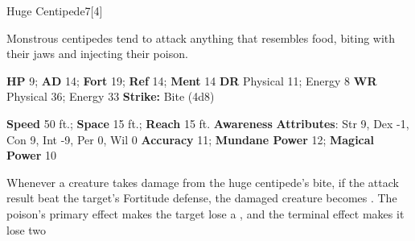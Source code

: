   \begin{monsection}{Huge Centipede}{7}[4]
    \vspace{-1em}\vspace{-1em}
    \vspace{0em}

    
    Monstrous centipedes tend to attack anything that resembles food, biting with their jaws and injecting their poison.
  

    \begin{spellcontent}
      \begin{spelltargetinginfo}
        \pari \textbf{HP} 9;
          \textbf{AD} 14;
          \textbf{Fort} 19;
          \textbf{Ref} 14;
          \textbf{Ment} 14
        \pari \textbf{DR} Physical 11; Energy 8
        \pari \textbf{WR} Physical 36; Energy 33
        \pari \textbf{Strike:}
            Bite  (4d8)
      \end{spelltargetinginfo}
    \end{spellcontent}
    \begin{monsterfooter}
      \pari \textbf{Speed} 50 ft.;
        \textbf{Space} 15 ft.;
        \textbf{Reach} 15 ft.
      \pari \textbf{Awareness} 
      \pari \textbf{Attributes}:
        Str 9, Dex -1,
        Con 9, Int -9,
        Per 0, Wil 0
      \pari \textbf{Accuracy} 11;
        \textbf{Mundane Power} 12;
      \textbf{Magical Power} 10
    \end{monsterfooter}
  \end{monsection}
    Whenever a creature takes damage from the huge centipede's bite,
      if the attack result beat the target's Fortitude defense,
      the damaged creature becomes .
    The poison's primary effect makes the target lose a , and the terminal effect makes it lose two 
  
